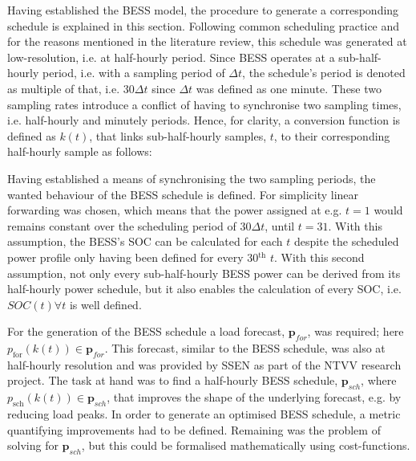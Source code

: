 Having established the BESS model, the procedure to generate a corresponding schedule is explained in this section.
Following common scheduling practice and for the reasons mentioned in the literature review, this schedule was generated at low-resolution, i.e. at half-hourly period.
Since BESS operates at a sub-half-hourly period, i.e. with a sampling period of $\Delta t$, the schedule's period is denoted as multiple of that, i.e. $30\Delta t$ since $\Delta t$ was defined as one minute.
These two sampling rates introduce a conflict of having to synchronise two sampling times, i.e. half-hourly and minutely periods.
Hence, for clarity, a conversion function is defined as $k(t)$, that links sub-half-hourly samples, $t$, to their corresponding half-hourly sample as follows:



Having established a means of synchronising the two sampling periods, the wanted behaviour of the BESS schedule is defined.
For simplicity linear forwarding was chosen, which means that the power assigned at e.g. $t=1$ would remains constant over the scheduling period of $30\Delta t$, until $t=31$.
With this assumption, the BESS's SOC can be calculated for each $t$ despite the scheduled power profile only having been defined for every 30$^\text{th}$ $t$.
With this second assumption, not only every sub-half-hourly BESS power can be derived from its half-hourly power schedule, but it also enables the calculation of every SOC, i.e. $SOC(t) \forall t$ is well defined.


For the generation of the BESS schedule a load forecast, $\textbf{p}_{for}$, was required; here $p_\text{for}(k(t)) \in \textbf{p}_{for}$.
This forecast, similar to the BESS schedule, was also at half-hourly resolution and was provided by SSEN as part of the NTVV research project.
The task at hand was to find a half-hourly BESS schedule, $\textbf{p}_{sch}$, where $p_\text{sch}(k(t)) \in \textbf{p}_{sch}$, that improves the shape of the underlying forecast, e.g. by reducing load peaks.
In order to generate an optimised BESS schedule, a metric quantifying improvements had to be defined.
Remaining was the problem of solving for $\textbf{p}_{sch}$, but this could be formalised mathematically using cost-functions.

